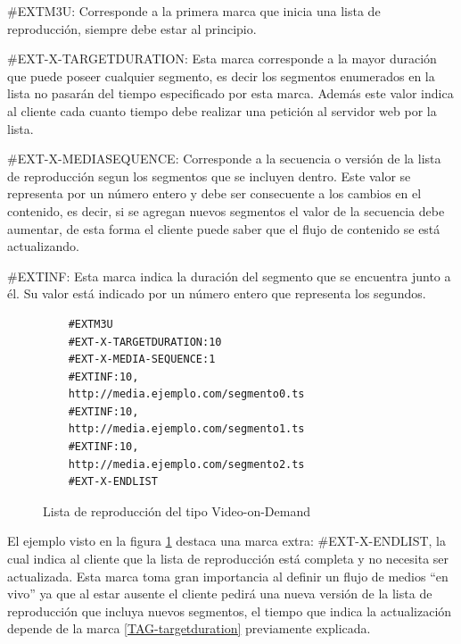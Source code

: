 \begin{prop}

\item \#EXTM3U: Corresponde a la primera marca que inicia una lista de reproducción, siempre debe estar al principio.

\item \#EXT-X-TARGETDURATION: Esta marca corresponde a la mayor duración que puede poseer cualquier segmento, es decir los segmentos enumerados en la lista no pasarán del tiempo especificado por esta marca.
Además este valor indica al cliente cada cuanto tiempo debe realizar una petición al servidor web por la lista.
\label{TAG-targetduration}

\item \label{TAG-mediasequence} \#EXT-X-MEDIASEQUENCE: Corresponde a la secuencia o versión de la lista de reproducción segun los segmentos que se incluyen dentro. Este valor se representa por un número entero y debe ser consecuente a los cambios en el contenido, es decir, si se agregan nuevos segmentos el valor de la secuencia debe aumentar, de esta forma el cliente puede saber que el flujo de contenido se está actualizando.


\item \label{TAG-extinfint} \#EXTINF: Esta marca indica la duración del segmento que se encuentra junto a él. Su valor está indicado por un número entero que representa los segundos.\\
\end{prop}

\begin{figure}[H]
	\centering
	\begin{lstlisting}
	#EXTM3U
	#EXT-X-TARGETDURATION:10
	#EXT-X-MEDIA-SEQUENCE:1
	#EXTINF:10,
	http://media.ejemplo.com/segmento0.ts
	#EXTINF:10,
	http://media.ejemplo.com/segmento1.ts
	#EXTINF:10,
	http://media.ejemplo.com/segmento2.ts
	#EXT-X-ENDLIST
	\end{lstlisting}
	\caption{Lista de reproducción del tipo Video-on-Demand}
	\label{ejemploM3U8}	
\end{figure}			

El ejemplo visto en la figura \ref{ejemploM3U8} destaca una marca extra: \#EXT-X-ENDLIST, la cual indica al cliente que la lista de reproducción está completa y no necesita ser actualizada. Esta marca toma gran importancia al definir un flujo de medios ``en vivo'' ya que al estar ausente el cliente pedirá una nueva versión de la lista de reproducción que incluya nuevos segmentos, el tiempo que indica la actualización depende de la marca \ref{TAG-targetduration} previamente explicada.\\

